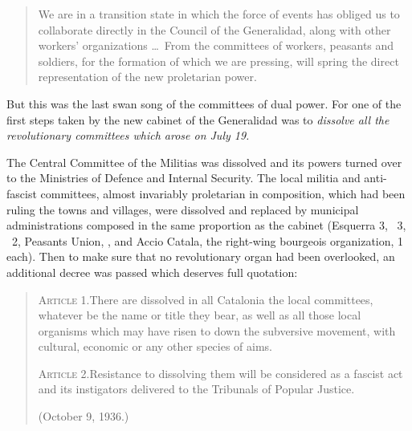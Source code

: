 \begin{quotation}
  We are in a transition state in which the force of events has obliged us to collaborate directly in the Council of the Generalidad, along with other workers’ organizations \dots\ From the committees of workers, peasants and soldiers, for the formation of which we are pressing, will spring the direct representation of the new proletarian power.
\end{quotation}

\vspace{-0.25\baselineskip}

But this was the last swan song of the committees of dual power. For one of the first steps taken by the new cabinet of the Generalidad was to \emph{dissolve all the revolutionary committees which arose on July 19.}

The Central Committee of the Militias was dissolved and its powers turned over to the Ministries of Defence and Internal Security. The local militia and anti-fascist committees, almost invariably proletarian in composition, which had been ruling the towns and villages, were dissolved and replaced by municipal administrations composed in the same proportion as the cabinet (Esquerra 3, \CNT\ 3, \PSUC\ 2, Peasants Union, \POUM, and Accio Catala, the right-wing bourgeois organization, 1 each). Then to make sure that no revolutionary organ had been overlooked, an additional decree was passed which deserves full quotation:

\begin{quote}
  \textsc{\textsf{Article 1.}}\quad There are dissolved in all Catalonia the local committees, whatever be the name or title they bear, as well as all those local organisms which may have risen to down the subversive movement, with cultural, economic or any other species of aims.
  
  \textsc{\textsf{Article 2.}}\quad Resistance to dissolving them will be considered as a fascist act and its instigators delivered to the Tribunals of Popular Justice.
  
  (October 9, 1936.)
\end{quote}

